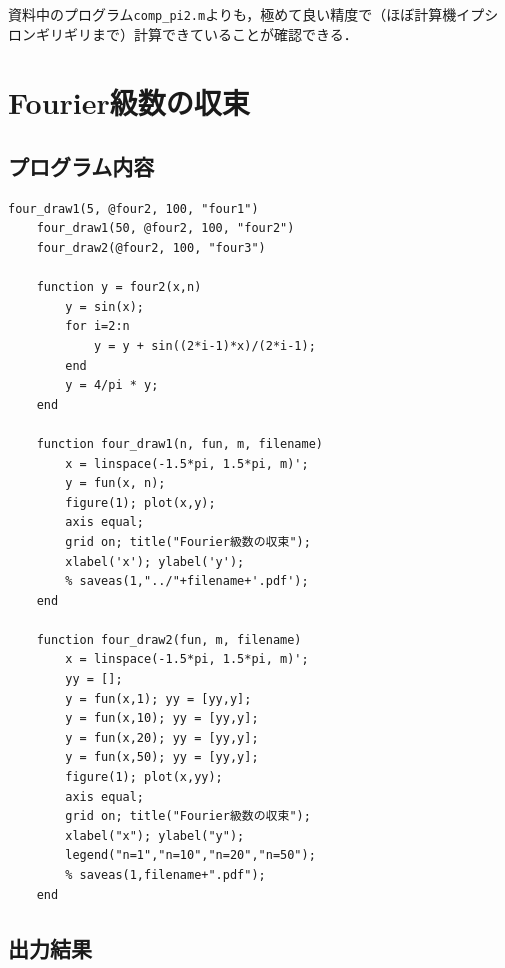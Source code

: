 \documentclass[uplatex, dvipdfmx]{jsarticle}
\begin{document}
資料中のプログラム\verb|comp_pi2.m|よりも，極めて良い精度で（ほぼ計算機イプシロンギリギリまで）計算できていることが確認できる．

\section{Fourier級数の収束}

\subsection{プログラム内容}

\begin{lstlisting}[caption=プログラム]
    four_draw1(5, @four2, 100, "four1")
    four_draw1(50, @four2, 100, "four2")
    four_draw2(@four2, 100, "four3")

    function y = four2(x,n)
        y = sin(x);
        for i=2:n
            y = y + sin((2*i-1)*x)/(2*i-1);
        end
        y = 4/pi * y;
    end

    function four_draw1(n, fun, m, filename)
        x = linspace(-1.5*pi, 1.5*pi, m)';
        y = fun(x, n);
        figure(1); plot(x,y);
        axis equal;
        grid on; title("Fourier級数の収束");
        xlabel('x'); ylabel('y');
        % saveas(1,"../"+filename+'.pdf');
    end

    function four_draw2(fun, m, filename)
        x = linspace(-1.5*pi, 1.5*pi, m)';
        yy = [];
        y = fun(x,1); yy = [yy,y];
        y = fun(x,10); yy = [yy,y];
        y = fun(x,20); yy = [yy,y];
        y = fun(x,50); yy = [yy,y];
        figure(1); plot(x,yy);
        axis equal;
        grid on; title("Fourier級数の収束");
        xlabel("x"); ylabel("y");
        legend("n=1","n=10","n=20","n=50");
        % saveas(1,filename+".pdf");
    end
\end{lstlisting}

\subsection{出力結果}
\end{document}

